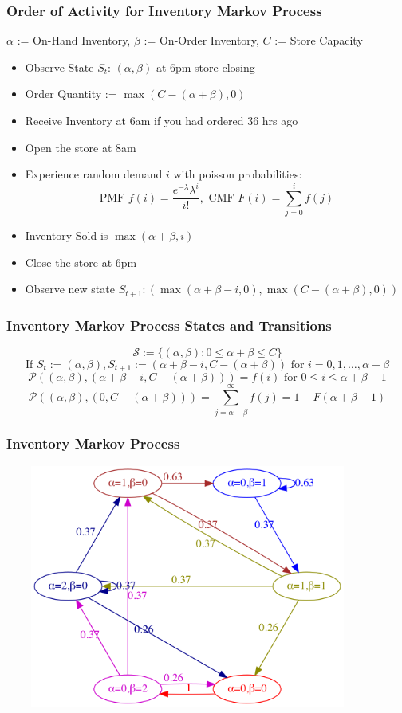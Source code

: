 \documentclass[handout]{beamer}
\begin{document}
\begin{frame}
\frametitle{Order of Activity for Inventory Markov Process}
\pause
$\alpha$ := On-Hand Inventory, $\beta$ := On-Order Inventory, $C$ := Store Capacity
\pause
\begin{itemize}[<+->]
\item Observe State $S_t$: $(\alpha, \beta)$ at 6pm store-closing
\item Order Quantity := $\max(C - (\alpha + \beta), 0)$
\item Receive Inventory at 6am if you had ordered 36 hrs ago
\item Open the store at 8am
\item Experience random demand $i$ with poisson probabilities:
$$\text{PMF } f(i) = \frac {e^{-\lambda} \lambda^i} {i!}, \text{ CMF } F(i) = \sum_{j=0}^i f(j)$$
\item Inventory Sold is $\max(\alpha + \beta, i)$
\item Close the store at 6pm
\item Observe new state $S_{t+1}: (\max(\alpha + \beta - i, 0), \max(C - (\alpha + \beta), 0))$
\end{itemize}
\end{frame}

\begin{frame}
\frametitle{Inventory Markov Process States and Transitions}
\pause
$$\mathcal{S} := \{(\alpha, \beta) : 0 \leq \alpha + \beta \leq C\}$$
\pause
$$\text{If } S_t := (\alpha, \beta), S_{t+1} := (\alpha + \beta - i, C - (\alpha + \beta)) \text{ for } i =0, 1, \ldots, \alpha + \beta$$
\pause
$$\mathcal{P}((\alpha, \beta), (\alpha + \beta - i, C - (\alpha + \beta))) = f(i)\text{ for } 0 \leq i \leq \alpha + \beta - 1$$
\pause
$$\mathcal{P}((\alpha, \beta), (0, C - (\alpha + \beta))) = \sum_{j=\alpha+\beta}^{\infty} f(j) = 1 - F(\alpha + \beta - 1)$$
\end{frame}

\begin{frame}
\frametitle{Inventory Markov Process}
\includegraphics[width=12cm, height=8cm]{simple_inv_mp.png}
\end{frame}
\end{document}
